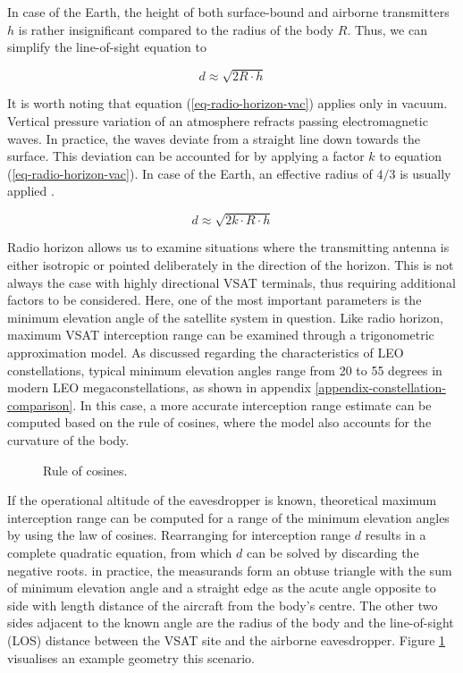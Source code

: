 \documentclass[english, 12pt, a4paper, elec, utf8, a-1b, online]{aaltothesis}
\begin{document}
In case of the Earth, the height of both surface-bound and airborne transmitters $h$ is rather insignificant compared to the radius of the body $R$. Thus, we can simplify the line-of-sight equation to

\begin{equation} \label{eq-radio-horizon-vac}
  d \approx \sqrt{2R \cdot h}
\end{equation}

It is worth noting that equation (\ref{eq-radio-horizon-vac}) applies only in vacuum.
Vertical pressure variation of an atmosphere refracts passing electromagnetic waves. In practice, the waves deviate from a straight line down towards the surface. This deviation can be accounted for by applying a factor $k$ to equation (\ref{eq-radio-horizon-vac}). In case of the Earth, an effective radius of $4/3$ is usually applied \cite{seybold2005introduction}.

\begin{equation} \label{eq-radio-horizon-ath}
  d \approx \sqrt{2 k \cdot R \cdot h}
\end{equation}

Radio horizon allows us to examine situations where the transmitting antenna is either isotropic or pointed deliberately in the direction of the horizon.
This is not always the case with highly directional VSAT terminals, thus requiring additional factors to be considered.
Here, one of the most important parameters is the minimum elevation angle of the satellite system in question.
Like radio horizon, maximum VSAT interception range can be examined through a trigonometric approximation model.
As discussed regarding the characteristics of LEO constellations, typical minimum elevation angles range from 20 to 55 degrees in modern LEO megaconstellations, as shown in appendix \ref{appendix-constellation-comparison}.
In this case, a more accurate interception range estimate can be computed based on the rule of cosines, where the model also accounts for the curvature of the body.

\begin{figure}[h]
  \centering
  
  \caption{Rule of cosines.}
  \label{fig-cosine-rule-interception}
\end{figure}

If the operational altitude of the eavesdropper is known, theoretical maximum interception range can be computed for a range of the minimum elevation angles by using the law of cosines.
Rearranging for interception range $d$ results in a complete quadratic equation, from which $d$ can be solved by discarding the negative roots.
in practice, the measurands form an obtuse triangle with the sum of minimum elevation angle and a straight edge as the acute angle opposite to side with length distance of the aircraft from the body's centre. %
The other two sides adjacent to the known angle are the radius of the body and the line-of-sight (LOS) distance between the VSAT site and the airborne eavesdropper.
Figure \ref{fig-cosine-rule-interception} visualises an example geometry this scenario.
\end{document}
